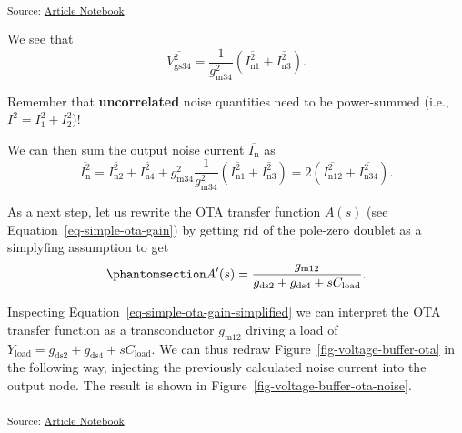 \documentclass[
  a4paper,
  DIV=11,
  numbers=noendperiod]{scrartcl}
\begin{document}
\textsubscript{Source:
\href{https://iic-jku.github.io/analog-circuit-design/index.qmd.html}{Article
Notebook}}

We see that \[
\overline{V_\mathrm{gs34}^2} = \frac{1}{g_\mathrm{m34}^2} \left( \overline{I_\mathrm{n1}^2} + \overline{I_\mathrm{n3}^2} \right).
\]

\begin{tcolorbox}[enhanced jigsaw, breakable, title=\textcolor{quarto-callout-important-color}{\faExclamation}\hspace{0.5em}{Noise Addition}, left=2mm, bottomrule=.15mm, opacitybacktitle=0.6, opacityback=0, colframe=quarto-callout-important-color-frame, leftrule=.75mm, bottomtitle=1mm, colbacktitle=quarto-callout-important-color!10!white, toprule=.15mm, rightrule=.15mm, toptitle=1mm, titlerule=0mm, arc=.35mm, colback=white, coltitle=black]

Remember that \textbf{uncorrelated} noise quantities need to be
power-summed (i.e., \(I^2 = I_1^2 + I_2^2\))!

\end{tcolorbox}

We can then sum the output noise current \(\overline{I_\mathrm{n}}\) as
\[
\overline{I_\mathrm{n}^2} = \overline{I_\mathrm{n2}^2} + \overline{I_\mathrm{n4}^2} + g_\mathrm{m34}^2 \frac{1}{g_\mathrm{m34}^2} \left( \overline{I_\mathrm{n1}^2} + \overline{I_\mathrm{n3}^2} \right) = 2 \left( \overline{I_\mathrm{n12}^2} + \overline{I_\mathrm{n34}^2} \right).
\]

As a next step, let us rewrite the OTA transfer function \(A(s)\) (see
Equation~\ref{eq-simple-ota-gain}) by getting rid of the pole-zero
doublet as a simplyfing assumption to get
\begin{equation}\phantomsection\label{eq-simple-ota-gain-simplified}{
A'(s) = \frac{g_\mathrm{m12}}{g_\mathrm{ds2} + g_\mathrm{ds4} + s C_\mathrm{load}}.
}\end{equation}

Inspecting Equation~\ref{eq-simple-ota-gain-simplified} we can interpret
the OTA transfer function as a transconductor \(g_\mathrm{m12}\) driving
a load of
\(Y_\mathrm{load} = g_\mathrm{ds2} + g_\mathrm{ds4} + s C_\mathrm{load}\).
We can thus redraw Figure~\ref{fig-voltage-buffer-ota} in the following
way, injecting the previously calculated noise current into the output
node. The result is shown in Figure~\ref{fig-voltage-buffer-ota-noise}.

\textsubscript{Source:
\href{https://iic-jku.github.io/analog-circuit-design/index.qmd.html}{Article
Notebook}}
\end{document}
